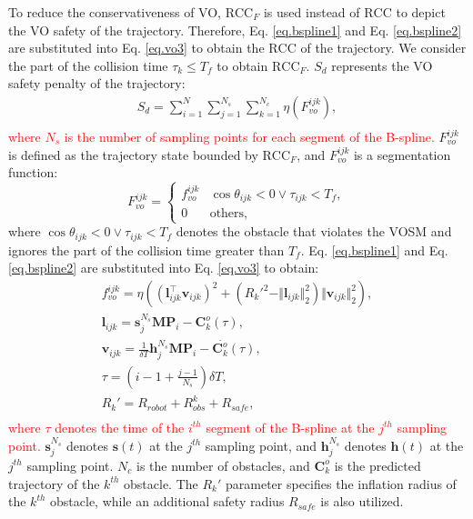 \documentclass[preprint,5p,times,twocolumn,authoryear]{elsarticle}
\begin{document}
To reduce the conservativeness of VO, $\text{RCC}_F$ is used instead of $\text{RCC}$ to depict the VO safety of the trajectory. Therefore, Eq. \ref{eq.bspline1} and Eq. \ref{eq.bspline2} are substituted into Eq. \ref{eq.vo3} to obtain the $\text{RCC}$ of the trajectory. We consider the part of the collision time $\tau_k \leq T_f$ to obtain $\text{RCC}_F$. $S_d$ represents the VO safety penalty of the trajectory:
\begin{equation}
\label{eq.bspline6}
\begin{aligned}
    & S_d = \sum_{i=1}^{N}\sum_{j=1}^{N_s}\sum_{k=1}^{N_c}\eta(F^{ijk}_{vo}), &\\
\end{aligned}
\end{equation}
\textcolor{red}{where $N_s$ is the number of sampling points for each segment of the B-spline.} $F^{ijk}_{vo}$ is defined as the trajectory state bounded by $\text{RCC}_F$, and $F^{ijk}_{vo}$ is a segmentation function:
\begin{equation}
\label{eq.bspline7}
F^{ijk}_{vo} = \begin{cases}
f^{ijk}_{vo} &  \cos{\theta_{ijk}} <0 \vee \tau_{ijk} < T_f, \\
0 & \text{others},
\end{cases}
\end{equation}
where $\cos{\theta_{ijk}} < 0 \vee \tau_{ijk} < T_f$ denotes the obstacle that violates the VOSM and ignores the part of the collision time greater than $T_f$. Eq. \ref{eq.bspline1} and Eq. \ref{eq.bspline2} are substituted into Eq. \ref{eq.vo3} to obtain:
\begin{equation}
\label{eq.bspline8}
\begin{aligned}
    & f^{ijk}_{vo} = \eta((\bm{l}_{ijk}^\top \bm{v}_{ijk})^2 + ( R_k'^2 - \Vert \bm{l}_{ijk} \Vert_2^2 ) \Vert \bm{v}_{ijk} \Vert_2^2), &\\
    & \bm{l}_{ijk} = \textbf{s}_j^{N_s} \textbf{M}\textbf{P}_i - \bm{C}_k^{o}(\tau), &\\
    & \bm{v}_{ijk} = \frac{1}{\delta T} \textbf{h}_j^{N_s} \textbf{M}\textbf{P}_i - \overset{.}{\bm{C}_k^{o}}(\tau), &\\
    & \tau = (i-1+\frac{j-1}{N_s})\delta T, &\\
    & R_k' = R_{robot} + R_{obs}^k + R_{safe} , &\\
\end{aligned}
\end{equation}
\textcolor{red}{where $\tau$ denotes the time of the $i^{th}$ segment of the B-spline at the $j^{th}$ sampling point.} $\textbf{s}_j^{N_s}$ denotes $\textbf{s}(t)$ at the $j^{th}$ sampling point, and $\textbf{h}_j^{N_s}$ denotes $\textbf{h}(t)$ at the $j^{th}$ sampling point. $N_c$ is the number of obstacles, and ${\bm{C}_k^{o}}$ is the predicted trajectory of the $k^{th}$ obstacle. The $R_k'$ parameter specifies the inflation radius of the $k^{th}$ obstacle, while an additional safety radius $R_{safe}$ is also utilized.
\end{document}
